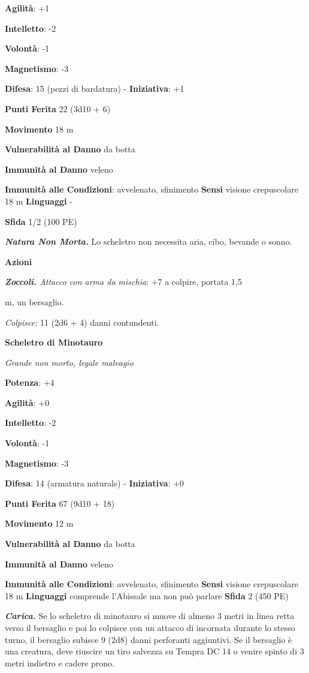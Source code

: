 \begin{multicols}{2}
\textbf{Agilità}: +1

\textbf{Intelletto}: -2

\textbf{Volontà}: -1

\textbf{Magnetismo}: -3

\textbf{Difesa}: 15 (pezzi di bardatura) - \textbf{Iniziativa}: +1

\textbf{Punti Ferita} 22 (3d10 + 6)

\textbf{Movimento} 18 m

\textbf{Vulnerabilità al Danno} da botta

\textbf{Immunità al Danno} veleno

\textbf{Immunità alle Condizioni}: avvelenato, sfinimento \textbf{Sensi}
visione crepuscolare 18 m \textbf{Linguaggi} -

\textbf{Sfida} 1/2 (100 PE)\smallskip

\emph{\textbf{Natura Non Morta.}} Lo scheletro non necessita aria, cibo,
bevande o sonno.

\smallskip\textbf{Azioni}


\emph{\textbf{Zoccoli.} Attacco con arma da mischia}: +7 a colpire,
portata 1,5

m, un bersaglio.

\emph{Colpisce:} 11 (2d6 + 4) danni contundenti.


\textbf{Scheletro di Minotauro}

\emph{Grande non morto, legale malvagio}

\textbf{Potenza}: +4

\textbf{Agilità}: +0

\textbf{Intelletto}: -2

\textbf{Volontà}: -1

\textbf{Magnetismo}: -3

\textbf{Difesa}: 14 (armatura naturale) - \textbf{Iniziativa}: +0

\textbf{Punti Ferita} 67 (9d10 + 18)

\textbf{Movimento} 12 m

\textbf{Vulnerabilità al Danno} da botta

\textbf{Immunità al Danno} veleno

\textbf{Immunità alle Condizioni}: avvelenato, sfinimento \textbf{Sensi}
visione crepuscolare 18 m \textbf{Linguaggi} comprende
l'Abissale ma non può parlare \textbf{Sfida} 2 (450 PE)\smallskip

\emph{\textbf{Carica.}} Se lo scheletro di minotauro si muove di almeno
3 metri in linea retta verso il bersaglio e poi lo colpisce con un
attacco di incornata durante lo stesso turno, il bersaglio subisce 9
(2d8) danni perforanti aggiuntivi. Se il bersaglio è una creatura, deve
riuscire un tiro salvezza su Tempra DC 14 o venire spinto di 3 metri
indietro e cadere prono.


\end{multicols}
